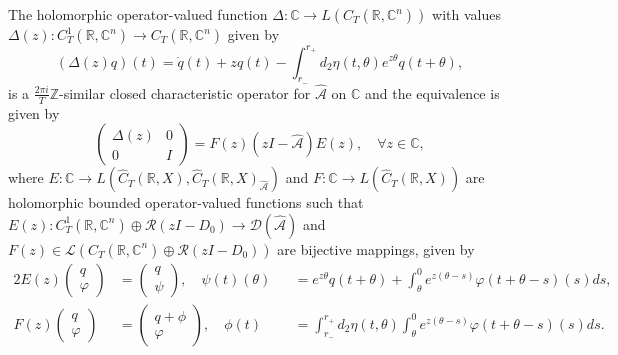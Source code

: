 \documentclass[english]{myarticle}
\begin{document}
\begin{sloppypar}
\begin{theorem}
The holomorphic operator-valued function $\Delta : \mathbb{C} \to L(C_T(\mathbb{R},\mathbb{C}^n))$ with values $\Delta(z) : C_T^1(\mathbb{R},\mathbb{C}^n) \to C_T(\mathbb{R},\mathbb{C}^n)$ given by
\begin{equation*}
    (\Delta(z)q)(t) = \dot{q}(t) + z q(t) - \int_{r_{-}}^{r_{+}} d_2 \eta(t,\theta) e^{z \theta} q(t+\theta),
\end{equation*}
is a $\frac{2\pi i}{T}\mathbb{Z}$-similar closed characteristic operator for $\hat{\mathcal{A}}$ on $\mathbb{C}$ and the equivalence is given by
\begin{equation*}
    \begin{pmatrix}
        \Delta(z) & 0 \\
        0 & I 
    \end{pmatrix}
    =
    F(z)(z I - \hat{\mathcal{A}})E(z), \quad \forall z \in \mathbb{C},
\end{equation*}
where $E : \mathbb{C} \to L(\hat{C}_T(\mathbb{R},X),\hat{C}_T(\mathbb{R},X)_{\hat{\mathcal{A}}})$ and $F : \mathbb{C} \to L(\hat{C}_T(\mathbb{R},X))$ are holomorphic bounded operator-valued functions such that $E(z) : C_T^1(\mathbb{R},\mathbb{C}^n) \oplus \mathcal{R}(zI-D_0) \to \mathcal{D}(\hat{\mathcal{A}})$ and $F(z) \in \mathcal{L}(C_T(\mathbb{R},\mathbb{C}^n) \oplus \mathcal{R}(zI-D_0))$ are bijective mappings, given by
\begin{alignat*}{2}
    E(z)
    \begin{pmatrix}
    q\\
    \varphi
    \end{pmatrix}
    &=
    \begin{pmatrix}
    q\\
    \psi
    \end{pmatrix}, \quad
        \psi(t)(\theta) &&= e^{z \theta}q(t+\theta)+ \int_{\theta}^0 e^{z(\theta-s)}\varphi(t+\theta-s)(s) ds, \\
    F(z)
    \begin{pmatrix}
    q\\
    \varphi
    \end{pmatrix}
    &=
    \begin{pmatrix}
    q + \phi\\
    \varphi
    \end{pmatrix}, \quad
        \phi(t) &&= \int_{r_{-}}^{r_{+}} d_2\eta(t,\theta) \int_{\theta}^0 e^{z(\theta-s)}\varphi(t+\theta-s)(s) ds.
\end{alignat*}
\end{theorem}


\end{sloppypar}
\end{document}
